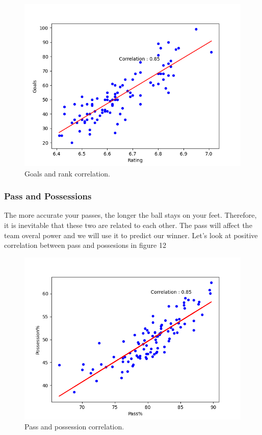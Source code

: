 \documentclass[conference]{IEEEtran}
\begin{document}
\begin{figure}[h]
  \includegraphics[width=\linewidth]{Goal_rank_corr.png}
  \caption{Goals and rank correlation.}
  \label{fig:Goal_rank_corrr}
\end{figure}


\subsubsection{Pass and Possessions}
The more accurate your passes, the longer the ball stays on your feet. Therefore, it is inevitable that these two are related to each other. The pass will affect the team overal power and we will use it to predict our winner. Let's look at positive correlation between pass and possesions in figure 12


\begin{figure}[h]
  \includegraphics[width=\linewidth]{Pass_possesion_corr.png}
  \caption{Pass and possession correlation.}
  \label{fig:Pass_possesion_corr}
\end{figure}
\end{document}
